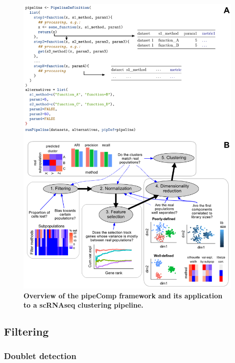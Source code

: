 \documentclass{bmcart}
\begin{document}
\begin{figure}
    \centering
    \includegraphics[width=\textwidth,keepaspectratio]{main_figures/pipeline_explanation.png}
    \caption{\textbf{Overview of the pipeComp framework and its application to a scRNAseq clustering pipeline.}}
    \label{fig:figure2}
\end{figure}

\subsection*{Filtering}

\subsubsection*{Doublet detection}
\end{document}
